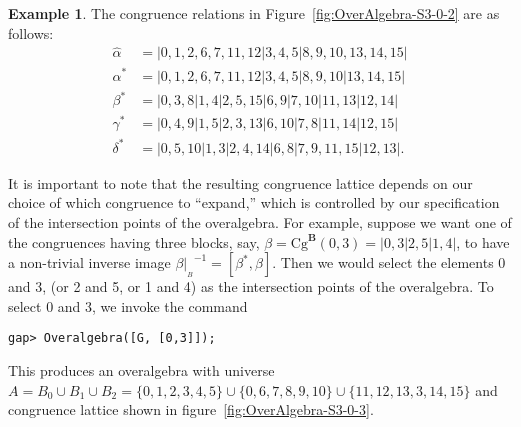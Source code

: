 \documentclass[cm,dissertation,actual,final]{uhthesis}
\theoremstyle{plain}
\theoremstyle{definition}
\newtheorem{example}[theorem]{Example}
\theoremstyle{remark}
\numberwithin{theorem}{section}
\numberwithin{claim}{chapter}
\numberwithin{equation}{section}
\numberwithin{conjecture}{chapter}
\newcommand{\<}{\ensuremath{\langle}}
\renewcommand{\>}{\ensuremath{\rangle}}
\newcommand{\Cg}{\ensuremath{\mathrm{Cg}}}
\newcommand{\0}{\ensuremath{\mathbf{0}}}
\newcommand{\1}{\ensuremath{\mathbf{1}}}
\newcommand{\2}{\ensuremath{\mathbf{2}}}
\newcommand{\3}{\ensuremath{\mathbf{3}}}
\newcommand{\4}{\ensuremath{\mathbf{4}}}
\newcommand{\5}{\ensuremath{\mathbf{5}}}
\newcommand{\bB}{\ensuremath{\mathbf{B}}}
\newcommand{\resB}{\ensuremath{|_{_B}}}
\begin{document}
\begin{example}
  The congruence relations in Figure~\ref{fig:OverAlgebra-S3-0-2} are as follows:
  \begin{align*}
    \widehat{\alpha} &=|0,1,2,6,7,11,12|3,4,5|8,9,10,13,14,15| \\
    \alpha^* &=|0,1,2,6,7,11,12|3,4,5|8,9,10|13,14,15| \\
    \beta^*&=|0,3,8|1,4|2,5,15|6,9|7,10|11,13|12,14| \\
    \gamma^*&=|0,4,9|1,5|2,3,13|6,10|7,8|11,14|12,15| \\
    \delta^*&=|0,5,10|1,3|2,4,14|6,8|7,9,11,15|12,13|.
  \end{align*}

  It is important to note that the resulting congruence lattice depends
  on our choice of which congruence to ``expand,'' which is controlled by 
  our specification of the intersection points of the overalgebra.
  For example, suppose we want one of the congruences having three
  blocks, say, $\beta = \Cg^\bB(0,3) =| 0, 3 | 2, 5 | 1, 4 |$, to have a non-trivial
  inverse image $\beta\resB^{-1} = 
  [\beta^*, \widehat{\beta}]$.  Then we would select the elements 0
  and 3, (or 2 and 5, or 1 and 4) as the intersection points of the overalgebra.
  To select 0 and 3, we invoke the command 
  {\footnotesize
\begin{verbatim}
gap> Overalgebra([G, [0,3]]);
\end{verbatim}
  }

  \noindent This produces an overalgebra with universe
  $A = B_0 \cup B_1 \cup B_2
  = \{0, 1,  2,  3,  4,  5\} \cup \{ 0, 6,  7,  8,  9, 10\} \cup
  \{11, 12, 13, 3, 14, 15\}$
  and congruence lattice shown in figure~\ref{fig:OverAlgebra-S3-0-3}.


\end{example}
\end{document}
